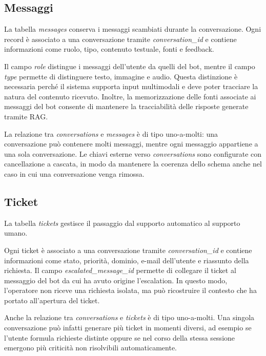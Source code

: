 \subsection*{Messaggi}

La tabella \textit{messages} conserva i messaggi scambiati durante la conversazione. Ogni record è associato a una conversazione tramite \textit{conversation\_id} e contiene informazioni come ruolo, tipo, contenuto testuale, fonti e feedback.

Il campo \textit{role} distingue i messaggi dell’utente da quelli del bot, mentre il campo \textit{type} permette di distinguere testo, immagine e audio. Questa distinzione è necessaria perché il sistema supporta input multimodali e deve poter tracciare la natura del contenuto ricevuto. Inoltre, la memorizzazione delle fonti associate ai messaggi del bot consente di mantenere la tracciabilità delle risposte generate tramite RAG.

La relazione tra \textit{conversations} e \textit{messages} è di tipo uno-a-molti: una conversazione può contenere molti messaggi, mentre ogni messaggio appartiene a una sola conversazione. Le chiavi esterne verso \textit{conversations} sono configurate con cancellazione a cascata, in modo da mantenere la coerenza dello schema anche nel caso in cui una conversazione venga rimossa.

\subsection*{Ticket}

La tabella \textit{tickets} gestisce il passaggio dal supporto automatico al supporto umano.

Ogni ticket è associato a una conversazione tramite \textit{conversation\_id} e contiene informazioni come stato, priorità, dominio, e-mail dell’utente e riassunto della richiesta. Il campo \textit{escalated\_message\_id} permette di collegare il ticket al messaggio del bot da cui ha avuto origine l’escalation. In questo modo, l’operatore non riceve una richiesta isolata, ma può ricostruire il contesto che ha portato all’apertura del ticket.

Anche la relazione tra \textit{conversations} e \textit{tickets} è di tipo uno-a-molti. Una singola conversazione può infatti generare più ticket in momenti diversi, ad esempio se l’utente formula richieste distinte oppure se nel corso della stessa sessione emergono più criticità non risolvibili automaticamente.

